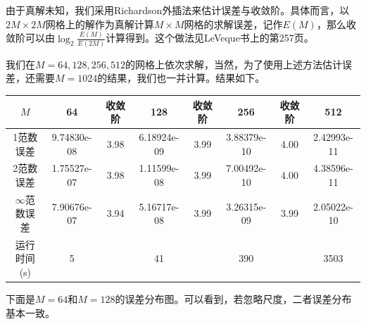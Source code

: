 \documentclass[lang=cn,10pt,bibend=bibtex]{elegantbook}
\begin{document}
由于真解未知，我们采用Richardson外插法来估计误差与收敛阶。具体而言，以$2M\times 2M$网格上的解作为真解计算$M\times M$网格的求解误差，记作$E(M)$，那么收敛阶可以由$\log_2\frac{E(M)}{E(2M)}$计算得到。这个做法见LeVeque书\cite{2007Finite}上的第257页。

我们在$M=64,128,256,512$的网格上依次求解，当然，为了使用上述方法估计误差，还需要$M=1024$的结果，我们也一并计算。结果如下。

\begin{table}[H]
  \centering
  \small
  \begin{tabular}{c|ccccccc}
  \textbf{$M$}              & 64          & 收敛阶 & 128         & 收敛阶 & 256         & 收敛阶 & 512   \\ \hline
  1范数误差                  & 9.74830e-08 & 3.98  & 6.18924e-09 & 3.99  & 3.88379e-10 &  4.00 & 2.42993e-11 \\
  2范数误差                  & 1.75527e-07 & 3.98  & 1.11599e-08 & 3.99  & 7.00492e-10 &  4.00 & 4.38596e-11 \\
  $\infty$范数误差           & 7.90676e-07 & 3.94  & 5.16717e-08 & 3.99  & 3.26315e-09 &  3.99 & 2.05022e-10 \\
  运行时间(s)                & 5           &       & 41          &       & 390         &       & 3503
  \end{tabular}
\end{table}

下面是$M=64$和$M=128$的误差分布图。可以看到，若忽略尺度，二者误差分布基本一致。
\end{document}
